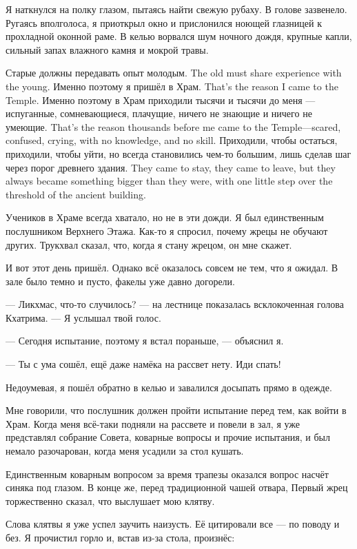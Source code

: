 Я наткнулся на полку глазом, пытаясь найти свежую рубаху.
В голове зазвенело.
Ругаясь вполголоса, я приоткрыл окно и прислонился ноющей глазницей к прохладной оконной раме.
В келью ворвался шум ночного дождя, крупные капли, сильный запах влажного камня и мокрой травы.

{Старые должны передавать опыт молодым.}
{The old must share experience with the young.}
{Именно поэтому я пришёл в Храм.}
{That's the reason I came to the Temple.}
{Именно поэтому в Храм приходили тысячи и тысячи до меня --- испуганные, сомневающиеся, плачущие, ничего не знающие и ничего не умеющие.}
{That's the reason thousands before me came to the Temple---scared, confused, crying, with no knowledge, and no skill.}
{Приходили, чтобы остаться, приходили, чтобы уйти, но всегда становились чем-то большим, лишь сделав шаг через порог древнего здания.}
{They came to stay, they came to leave, but they always became something bigger than they were, with one little step over the threshold of the ancient building.}

Учеников в Храме всегда хватало, но не в эти дожди.
Я был единственным послушником Верхнего Этажа.
Как-то я спросил, почему жрецы не обучают других.
Трукхвал сказал, что, когда я стану жрецом, он мне скажет.

И вот этот день пришёл.
Однако всё оказалось совсем не тем, что я ожидал.
В зале было темно и пусто, факелы уже давно догорели.

--- Ликхмас, что-то случилось? --- на лестнице показалась всклокоченная голова Кхатрима.
--- Я услышал твой голос.

--- Сегодня испытание, поэтому я встал пораньше, --- объяснил я.

--- Ты с ума сошёл, ещё даже намёка на рассвет нету.
Иди спать!

Недоумевая, я пошёл обратно в келью и завалился досыпать прямо в одежде.

Мне говорили, что послушник должен пройти испытание перед тем, как войти в Храм.
Когда меня всё-таки подняли на рассвете и повели в зал, я уже представлял собрание Совета, коварные вопросы и прочие испытания, и был немало разочарован, когда меня усадили за стол кушать.

Единственным коварным вопросом за время трапезы оказался вопрос насчёт синяка под глазом.
В конце же, перед традиционной чашей отвара, Первый жрец торжественно сказал, что выслушает мою клятву.

Слова клятвы я уже успел заучить наизусть.
Её цитировали все --- по поводу и без. Я прочистил горло и, встав из-за стола, произнёс:

